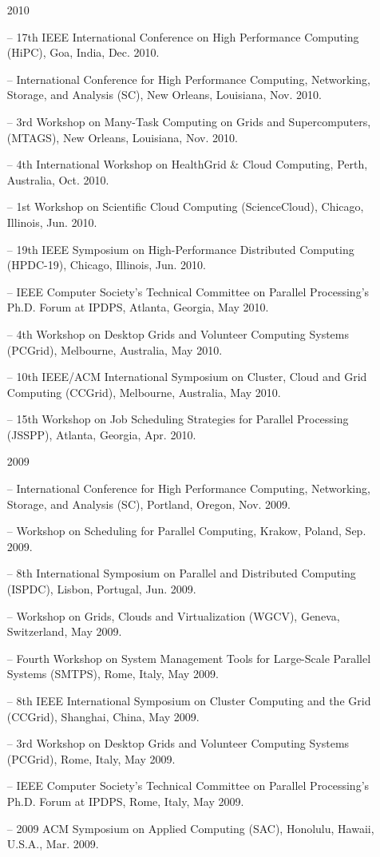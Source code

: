 \documentclass[times,11pt]{letter}
\begin{document}
\begin{itemize}
\item [2010]
\item[--] 17th IEEE International Conference on High Performance Computing (HiPC), Goa, India, Dec. 2010.
\item[--]  International Conference for High Performance Computing, Networking, Storage, and Analysis (SC), New Orleans, Louisiana, Nov. 2010.
\item[--]  3rd Workshop on Many-Task Computing on Grids and Supercomputers, (MTAGS), New Orleans, Louisiana, Nov. 2010.
\item[--] 4th International Workshop on HealthGrid \& Cloud Computing, Perth, Australia, Oct. 2010.
\item[--]  1st Workshop on Scientific Cloud Computing (ScienceCloud), Chicago, Illinois, Jun. 2010. 
\item[--]  19th IEEE Symposium on High-Performance Distributed Computing (HPDC-19), Chicago, Illinois, Jun. 2010. 
\item[--]  IEEE Computer Society's Technical Committee on Parallel Processing's Ph.D. Forum at IPDPS, Atlanta, Georgia, May 2010.
\item[--]  4th Workshop on Desktop Grids and Volunteer Computing Systems (PCGrid), Melbourne, Australia, May 2010.
\item[--]  10th IEEE/ACM International Symposium on Cluster, Cloud and Grid Computing (CCGrid), Melbourne, Australia, May 2010.
\item[--]  15th Workshop on Job Scheduling Strategies for Parallel Processing (JSSPP),  Atlanta, Georgia, Apr. 2010.

\item [2009]
\item[--]  International Conference for High Performance Computing, Networking, Storage, and Analysis (SC), Portland, Oregon, Nov. 2009.
\item[--]  Workshop on Scheduling for Parallel Computing, Krakow, Poland, Sep. 2009.
\item[--]  8th International Symposium on Parallel and Distributed Computing (ISPDC), Lisbon, Portugal, Jun. 2009.
\item[--]  Workshop on Grids, Clouds and Virtualization (WGCV), Geneva, Switzerland, May 2009.
\item[--]  Fourth Workshop on System Management Tools for Large-Scale Parallel Systems (SMTPS), Rome, Italy, May 2009.
\item[--]  8th IEEE International Symposium on Cluster Computing and the Grid (CCGrid), Shanghai, China, May 2009.
\item[--]  3rd Workshop on Desktop Grids and Volunteer Computing Systems (PCGrid), Rome, Italy, May 2009.
\item[--]  IEEE Computer Society's Technical Committee on Parallel Processing's Ph.D. Forum at IPDPS, Rome, Italy, May 2009.
\item[--]  2009 ACM Symposium on Applied Computing (SAC), Honolulu, Hawaii, U.S.A., Mar. 2009.


\end{itemize}
\end{document}

